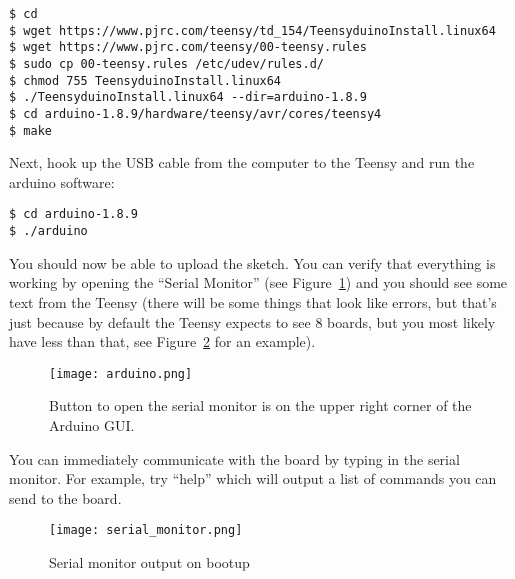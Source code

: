\documentclass[12pt,openright,twoside]{report}
\begin{document}
\begin{mdframed}[backgroundcolor=light-gray, roundcorner=10pt,leftmargin=1, rightmargin=1, innerleftmargin=15, innertopmargin=15,innerbottommargin=15, outerlinewidth=1, linecolor=light-gray]
\begin{lstlisting}
$ cd
$ wget https://www.pjrc.com/teensy/td_154/TeensyduinoInstall.linux64
$ wget https://www.pjrc.com/teensy/00-teensy.rules
$ sudo cp 00-teensy.rules /etc/udev/rules.d/
$ chmod 755 TeensyduinoInstall.linux64
$ ./TeensyduinoInstall.linux64 --dir=arduino-1.8.9
$ cd arduino-1.8.9/hardware/teensy/avr/cores/teensy4
$ make
\end{lstlisting}
\end{mdframed}

Next, hook up the USB cable from the computer to the Teensy and run the arduino software:

\begin{mdframed}[backgroundcolor=light-gray, roundcorner=10pt,leftmargin=1, rightmargin=1, innerleftmargin=15, innertopmargin=15,innerbottommargin=15, outerlinewidth=1, linecolor=light-gray]
\begin{lstlisting}
$ cd arduino-1.8.9
$ ./arduino
\end{lstlisting}
\end{mdframed}

You should now be able to upload the sketch. You can verify that everything is
working by opening the ``Serial Monitor'' (see Figure~\ref{fig:serial-monitor})
and you should see some text from the Teensy (there will be some things that
look like errors, but that's just because by default the Teensy expects to see
8 boards, but you most likely have less than that, see
Figure~\ref{fig:serial-monitor-output} for an example).

\begin{figure}
\centering
\texttt{[image: arduino.png]}
\caption{Button to open the serial monitor is on the upper right corner of the Arduino GUI.}
\label{fig:serial-monitor}
\end{figure}

You can immediately communicate with the board by typing in the serial monitor.
For example, try ``help'' which will output a list of commands you can send to
the board.

\begin{figure}
\centering
\texttt{[image: serial\_monitor.png]}
\caption{Serial monitor output on bootup}
\label{fig:serial-monitor-output}
\end{figure}
\end{document}
